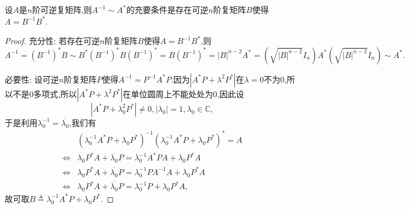 \documentclass[../../main.tex]{subfiles}%
\begin{document}
\begin{theorem}[]\label{theorem:}
设\( A \)是\( n \)阶可逆复矩阵,则\( A^{-1} \sim A^* \)的充要条件是存在可逆\( n \)阶复矩阵\( B \)使得\( A = B^{-1} B^* \).
\end{theorem}
\begin{proof}

{\heiti 充分性:} 若存在可逆\( n \)阶复矩阵\( B \)使得\( A = B^{-1} B^* \),则
\[
A^{-1}=(B^{-1})^*B\sim B^*(B^{-1})^*B(B^{-1})^*=B(B^{-1})^*=\left| B \right|^{n-2}A^*=\left( \sqrt{\left| B \right|^{n-2}}I_n \right) A^*\left( \sqrt{\left| B \right|^{n-2}}I_n \right) \sim A^*.
\]

{\heiti 必要性:} 设可逆\( n \)阶复矩阵\( P \)使得\( A^{-1} = P^{-1} A^* P \).因为\( |A^* P + \lambda^2 P^*| \)在\( \lambda = 0 \)不为0,所以不是0多项式,所以\( |A^* P + \lambda^2 P^*| \)在单位圆周上不能处处为0,因此设
\[
|A^* P + \lambda_0^2 P^*| \neq 0, |\lambda_0| = 1, \lambda_0 \in \mathbb{C},
\]
于是利用\( \lambda_0^{-1} = \overline{\lambda_0} \),我们有
\[
\begin{aligned}
& (\lambda_0^{-1} A^* P + \lambda_0 P^*)^{-1} (\lambda_0^{-1} A^* P + \lambda_0 P^*)^* = A \\
\iff  & \lambda_0 P^* A + \overline{\lambda_0} P = \lambda_0^{-1} A^* P A + \lambda_0 P^* A \\
\iff  & \lambda_0 P^* A + \overline{\lambda_0} P = \lambda_0^{-1} P A^{-1} A + \lambda_0 P^* A \\
\iff  & \lambda_0 P^* A + \overline{\lambda_0} P = \lambda_0^{-1} P + \lambda_0 P^* A,
\end{aligned}
\]
故可取\( B \triangleq \lambda_0^{-1} A^* P + \lambda_0 P^* \).

\end{proof}
\end{document}
